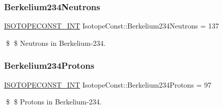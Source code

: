 \subsubsection{\texorpdfstring{Berkelium234\+Neutrons}{Berkelium234Neutrons}}
{\footnotesize\ttfamily \mbox{\hyperlink{group___isotope_const-_macros_ga5f18360b3e99483a35c32d789e62621c}{I\+S\+O\+T\+O\+P\+E\+C\+O\+N\+S\+T\+\_\+\+I\+NT}} Isotope\+Const\+::\+Berkelium234\+Neutrons = 137}

\$ \$ Neutrons in Berkelium-\/234. \mbox{\label{group___isotope_const-_berkelium-_bk234_ga08d8082d06dda59ae171fff652c99bbf}} 
\subsubsection{\texorpdfstring{Berkelium234\+Protons}{Berkelium234Protons}}
{\footnotesize\ttfamily \mbox{\hyperlink{group___isotope_const-_macros_ga5f18360b3e99483a35c32d789e62621c}{I\+S\+O\+T\+O\+P\+E\+C\+O\+N\+S\+T\+\_\+\+I\+NT}} Isotope\+Const\+::\+Berkelium234\+Protons = 97}

\$ \$ Protons in Berkelium-\/234. 